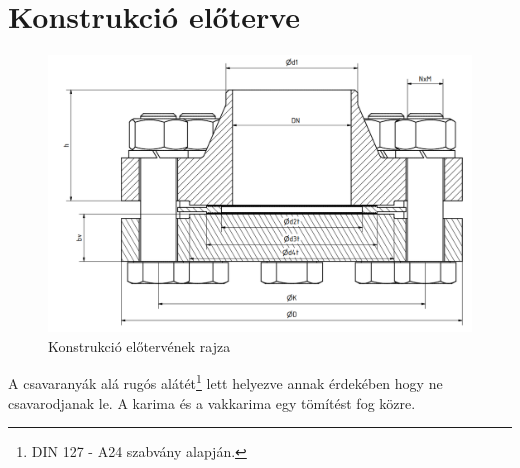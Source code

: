 \section{Konstrukció előterve}

\begin{figure}[hbt!]
	\centering
	\includegraphics[scale=.5]{./images/assembly-preplan.png}
	\caption{Konstrukció előtervének rajza}
\end{figure}

A csavaranyák alá rugós alátét\footnote{DIN 127 - A24 szabvány alapján.} lett helyezve annak érdekében hogy ne csavarodjanak le. A karima és a vakkarima egy tömítést fog közre.
